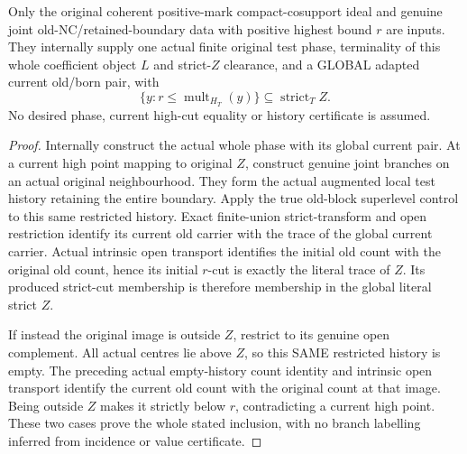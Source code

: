 \begin{theorem}
\label{hir:nc-original-phase-global-old-high-cut-control}
\leanok
Only the original coherent positive-mark compact-cosupport ideal and genuine
joint old-NC/retained-boundary data with positive highest bound $r$ are inputs.
They internally supply one actual finite original test phase, terminality of
this whole coefficient object $L$ and strict-$Z$ clearance, and a GLOBAL
adapted current old/born pair, with
\[
 \{y:r\le\operatorname{mult}_{H_T}(y)\}\subseteq\operatorname{strict}_T Z.
\]
No desired phase, current high-cut equality or history certificate is assumed.
\end{theorem}
\begin{proof}
Internally construct the actual whole phase with its global current pair.
At a current high point mapping to original $Z$, construct genuine joint
branches on an actual original neighbourhood. They form the actual augmented
local test history retaining the entire boundary. Apply the true old-block
superlevel control to this same restricted history. Exact finite-union
strict-transform and open restriction identify its current old carrier with
the trace of the global current carrier. Actual intrinsic open transport
identifies the initial old count with the original old count, hence its
initial $r$-cut is exactly the literal trace of $Z$. Its produced strict-cut
membership is therefore membership in the global literal strict $Z$.

If instead the original image is outside $Z$, restrict to its genuine open
complement. All actual centres lie above $Z$, so this SAME restricted history
is empty. The preceding actual empty-history count identity and intrinsic
open transport identify the current old count with the original count at
that image. Being outside $Z$ makes it strictly below $r$, contradicting a
current high point. These two cases prove the whole stated inclusion, with
no branch labelling inferred from incidence or value certificate.
\end{proof}

